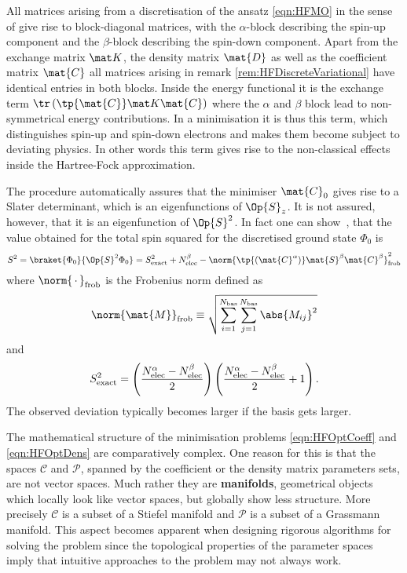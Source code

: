 \begin{rem}
	All matrices arising from a discretisation of the \HF ansatz \eqref{eqn:HFMO}
	in the sense of \UHF give rise to block-diagonal matrices,
	with the $\alpha$-block describing the
	spin-up component
	and the $\beta$-block describing the spin-down component.
	Apart from the exchange matrix $\matK$,
	the density matrix $\mat{D}$ as well as the coefficient matrix $\mat{C}$
	all matrices arising in remark \ref{rem:HFDiscreteVariational}
	have identical entries in both blocks.
	Inside the \HF energy functional
	it is the exchange term $\tr \left(\tp{\mat{C}} \matK \mat{C}\right)$
	where the $\alpha$ and $\beta$ block lead to non-symmetrical
	energy contributions.
	In a minimisation it is thus this term, which distinguishes
	spin-up and spin-down electrons and makes them become subject to deviating physics.
	In other words this term gives rise to the non-classical effects
	inside the Hartree-Fock approximation.

	The \UHF procedure automatically assures that the minimiser $\mat{C}_0$
	gives rise to a Slater determinant,
	which is an eigenfunctions of $\Op{S}_z$.
	It is not assured, however, that it is an eigenfunction of $\Op{S}^2$.
	In fact one can show~\cite{Szabo1996},
	that the value obtained for the total spin squared
	for the discretised \HF ground state $\Phi_0$ is
	\begin{equation}
		\label{eqn:UHFS2}
		S^2 = \braket{\Phi_0}{\Op{S}^2 \Phi_0}
		=
		S^2_\text{exact} + \NelecB -
		\norm{
		\tp{\left(\mat{C}^\alpha\right)} \mat{S}^\beta \mat{C}^\beta
		}_\text{frob}^2
	\end{equation}
	where $\norm{\slot}_\text{frob}$ is the Frobenius norm defined as
	\begin{equation}
		\norm{\mat{M}}_\text{frob} \equiv \sqrt{
			\sum_{i=1}^{\Nbas} \sum_{j=1}^{\Nbas} \abs{M_{ij}}^2}
		\label{eqn:FrobeniusNorm}
	\end{equation}
	and
	\[ S^2_\text{exact}
		= \left(\frac{N_\text{elec}^\alpha - N_\text{elec}^\beta}{2}\right)
			\left(\frac{N_\text{elec}^\alpha - N_\text{elec}^\beta}{2} +1\right).
	\]
	The observed deviation typically becomes larger if the basis gets larger.

	The mathematical structure of the minimisation problems
	\eqref{eqn:HFOptCoeff} and \eqref{eqn:HFOptDens} are comparatively complex.
	One reason for this is that the spaces $\mathcal{C}$ and $\mathcal{P}$,
	spanned by the coefficient or the density matrix parameters sets,
	are not vector spaces.
	Much rather they are \textbf{manifolds},
	\ie geometrical objects which locally look like vector spaces,
	but globally show less structure.
	More precisely $\mathcal{C}$ is a subset of a Stiefel manifold
	and $\mathcal{P}$ is a subset of a Grassmann manifold.
	This aspect becomes apparent
	when designing rigorous algorithms for solving the \HF problem
	since the
	topological properties of the \HF parameter spaces
	imply that intuitive approaches to the problem may not always work.
\end{rem}

